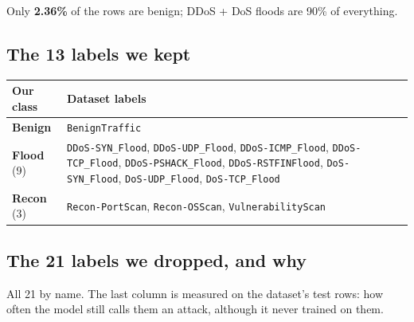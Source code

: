 \documentclass[11pt,a4paper]{article}
\newcommand{\file}[1]{\texttt{\small #1}}
\begin{document}
Only \textbf{2.36\%} of the rows are benign; DDoS + DoS floods are 90\% of everything.

\subsection{The 13 labels we kept}

\begin{center}
\begin{tabularx}{\linewidth}{P{2.6cm}L}
\toprule
Our class & Dataset labels \\
\midrule
\textbf{Benign} & \file{BenignTraffic} \\
\textbf{Flood} (9) & \file{DDoS-SYN\_Flood}, \file{DDoS-UDP\_Flood}, \file{DDoS-ICMP\_Flood}, \file{DDoS-TCP\_Flood},
\file{DDoS-PSHACK\_Flood}, \file{DDoS-RSTFINFlood}, \file{DoS-SYN\_Flood}, \file{DoS-UDP\_Flood},
\file{DoS-TCP\_Flood} \\
\textbf{Recon} (3) & \file{Recon-PortScan}, \file{Recon-OSScan}, \file{VulnerabilityScan} \\
\bottomrule
\end{tabularx}
\end{center}

\subsection{The 21 labels we dropped, and why}

All 21 by name. The last column is measured on the dataset's test rows: how often the model still calls them an
attack, although it never trained on them.
\end{document}
